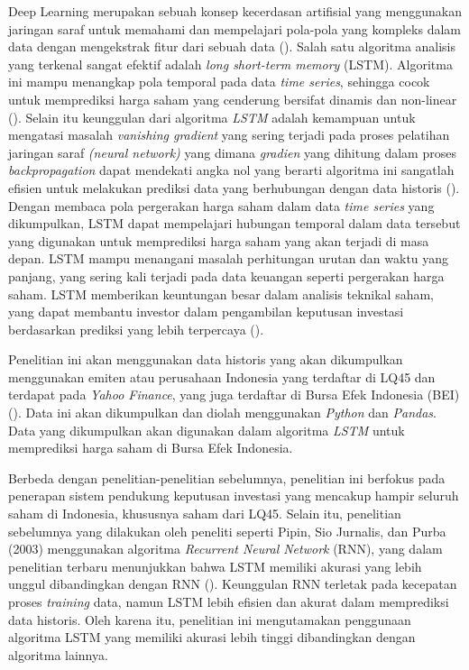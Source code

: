 Deep Learning merupakan sebuah konsep kecerdasan artifisial yang menggunakan jaringan saraf untuk memahami dan mempelajari pola-pola yang kompleks dalam data dengan mengekstrak fitur dari sebuah data (\cite{pipin2023prediksi}). Salah satu algoritma analisis yang terkenal sangat efektif adalah \textit{long short-term memory} (LSTM). Algoritma ini mampu menangkap pola temporal pada data \textit{time series}, sehingga cocok untuk memprediksi harga saham yang cenderung bersifat dinamis dan non-linear (\cite{chairurrachman2022penerapan}). Selain itu keunggulan dari algoritma \textit{LSTM} adalah kemampuan untuk mengatasi masalah \textit{vanishing gradient} yang sering terjadi pada proses pelatihan jaringan saraf \textit{(neural network)} yang dimana \textit{gradien} yang dihitung dalam proses \textit{backpropagation} dapat mendekati angka nol yang berarti algoritma ini sangatlah efisien untuk melakukan prediksi data yang berhubungan dengan data historis (\cite{alim2023pemodelan}). Dengan membaca pola pergerakan harga saham dalam data \textit{time series} yang dikumpulkan, LSTM dapat mempelajari hubungan temporal dalam data tersebut yang digunakan untuk memprediksi harga saham yang akan terjadi di masa depan. LSTM mampu menangani masalah perhitungan urutan dan waktu yang panjang, yang sering kali terjadi pada data keuangan seperti pergerakan harga saham. LSTM memberikan keuntungan besar dalam analisis teknikal saham, yang dapat membantu investor dalam pengambilan keputusan investasi berdasarkan prediksi yang lebih terpercaya (\cite{sofi2021perbandingan}).

Penelitian ini akan menggunakan data historis yang akan dikumpulkan menggunakan emiten atau perusahaan Indonesia yang terdaftar di LQ45 dan terdapat pada \textit{Yahoo Finance}, yang juga terdaftar di Bursa Efek Indonesia (BEI) (\cite{julian2021peramalan}). Data ini akan dikumpulkan dan diolah menggunakan \textit{Python} dan \textit{Pandas}. Data yang dikumpulkan akan digunakan dalam algoritma \textit{LSTM} untuk memprediksi harga saham di Bursa Efek Indonesia.

Berbeda dengan penelitian-penelitian sebelumnya, penelitian ini berfokus pada penerapan sistem pendukung keputusan investasi yang mencakup hampir seluruh saham di Indonesia, khususnya saham dari LQ45. Selain itu, penelitian sebelumnya yang dilakukan oleh peneliti seperti Pipin, Sio Jurnalis, dan Purba (2003) menggunakan algoritma \textit{Recurrent Neural Network} (RNN), yang dalam penelitian terbaru menunjukkan bahwa LSTM memiliki akurasi yang lebih unggul dibandingkan dengan RNN (\cite{alim2023pemodelan}). Keunggulan RNN terletak pada kecepatan proses \textit{training} data, namun LSTM lebih efisien dan akurat dalam memprediksi data historis. Oleh karena itu, penelitian ini mengutamakan penggunaan algoritma LSTM yang memiliki akurasi lebih tinggi dibandingkan dengan algoritma lainnya.

